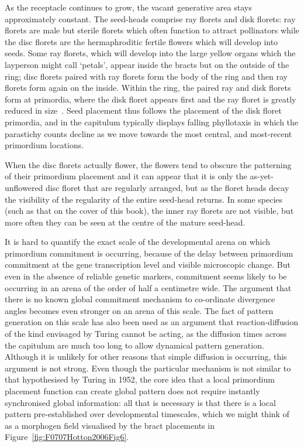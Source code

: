  As the receptacle continues to grow, the vacant generative area stays approximately constant.%
 The seed-heads comprise  ray florets and disk florets: ray florets are male but sterile florets which often function to attract pollinators while the disc florets are the hermaphroditic fertile flowers which will develop into seeds. Some ray florets, which will develop into the large yellow organs which the layperson might call `petals', appear inside the bracts but on the outside of the ring; disc florets paired with ray florets form the body of the ring and then ray florets form again on the inside. Within the ring, the paired ray and disk florets form at primordia, where the disk floret appears first and the ray floret is greatly reduced in size~\autocite{hottonPossibleActualPhyllotaxis2006}.  Seed placement thus follows the placement of 
the disk floret primordia, and  in the capitulum typically displays falling phyllotaxis in which the parastichy counts decline as we move towards the most central, and most-recent primordium locations.

When the disc florets actually flower, the flowers tend to obscure the patterning of their primordium placement and it can appear that it is only the as-yet-unflowered disc floret that are regularly arranged, but as the floret heads decay the visibility of the regularity of the entire seed-head returns.    In some species (such as that on the cover of this book), the inner ray florets are not visible, but more often they can be seen at the centre of the mature seed-head.

It is hard to quantify the exact scale of the developmental arena on which primordium commitment is occurring, because of the delay between primordium commitment at the gene transcription level and visible microscopic change. But even in the absence of reliable genetic markers, commitment seems likely to be occurring in an arena of the order of half a centimetre wide. The  argument that there is no known global commitment mechanism to co-ordinate divergence angles becomes even stronger on an arena of this scale.    The fact of pattern generation on this scale has also been used as an argument that reaction-diffusion of the kind envisaged by Turing cannot be acting, as the diffusion times across the capitulum are much too long to allow dynamical pattern generation. Although it is unlikely for other reasons that simple diffusion is occurring, this argument is not strong.   Even though the particular mechanism is not similar to that hypothesised by Turing in 1952, the core idea that a local primordium placement function can create global pattern does not require instantly synchronised global information: all that is necessary is that there is a local pattern pre-established over developmental timescales, which we might think of as a morphogen field visualised by the bract placements in Figure~\ref{fig:F0707Hotton2006Fig6}. 
 

